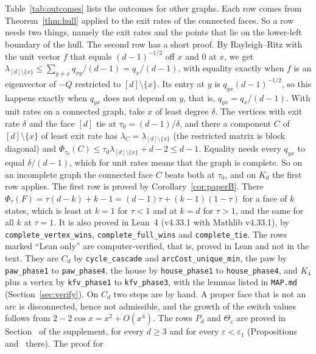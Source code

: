 \begin{remark}\label{rem:outcomes}
Table~\ref{tab:outcomes} lists the outcomes for other graphs. Each row comes
from Theorem~\ref{thm:hull} applied to the exit rates of the connected faces.
So a row needs two things, namely the exit rates and the points that lie on
the lower-left boundary of the hull. The second row has a short proof. By
Rayleigh--Ritz with the unit vector $f$ that equals $(d-1)^{-1/2}$ off $x$ and
$0$ at $x$, we get $\lambda_{[d]\setminus\{x\}}\le\sum_{y\ne x}q_{xy}/(d-1)=q_x/(d-1)$,
with equality exactly when $f$ is an eigenvector of $-Q$ restricted to
$[d]\setminus\{x\}$. Its entry at $y$ is $q_{yx}(d-1)^{-1/2}$, so this happens
exactly when $q_{yx}$ does not depend on $y$, that is, $q_{yx}=q_x/(d-1)$. With
unit rates on a connected graph, take $x$ of least degree $\delta$. The vertices
with exit rate $\delta$ and the face $[d]$ tie at $\tau_0=(d-1)/\delta$, and
there a component $C$ of $[d]\setminus\{x\}$ of least exit rate has
$\lambda_C=\lambda_{[d]\setminus\{x\}}$ (the restricted matrix is block diagonal)
and $\Phi_{\tau_0}(C)\le\tau_0\lambda_{[d]\setminus\{x\}}+d-2\le d-1$. Equality
needs every $q_{yx}$ to equal $\delta/(d-1)$, which for unit rates means that the
graph is complete. So on an incomplete graph the connected face $C$ beats both at
$\tau_0$, and on $K_d$ the first row applies. The first row is proved by
Corollary~\ref{cor:paperB}. There $\Phi_\tau(F)=\tau(d-k)+k-1=(d-1)\tau+(k-1)(1-\tau)$ for a face
of $k$ states, which is least at $k=1$ for $\tau<1$ and at $k=d$ for $\tau>1$, and the same for all
$k$ at $\tau=1$. It is also proved in Lean~4 (v4.33.1 with Mathlib v4.33.1), by
\texttt{complete\_vertex\_wins}, \texttt{complete\_full\_wins} and \texttt{complete\_tie}. The rows
marked ``Lean only'' are computer-verified, that is, proved in Lean and not in the text. They are
$C_d$ by
\texttt{cycle\_cascade} and \texttt{arcCost\_unique\_min}, the paw by
\texttt{paw\_phase1} to \texttt{paw\_phase4}, the house by \texttt{house\_phase1} to
\texttt{house\_phase4}, and $K_4$ plus a vertex by \texttt{kfv\_phase1} to
\texttt{kfv\_phase3}, with the lemmas listed in \nolinkurl{MAP.md}
(Section~\ref{sec:verify}). On $C_d$ two steps are by hand. A proper face that
is not an arc is disconnected, hence not admissible, and the growth of the
switch values follows from $2-2\cos x=x^2+O(x^4)$. The rows $P_d$ and
$\Theta_\varepsilon$ are proved in Section~ of the supplement, for every
$d\ge3$ and for every $\varepsilon<\varepsilon_1$
(Propositions~ and~ there). The proof for

\end{remark}

